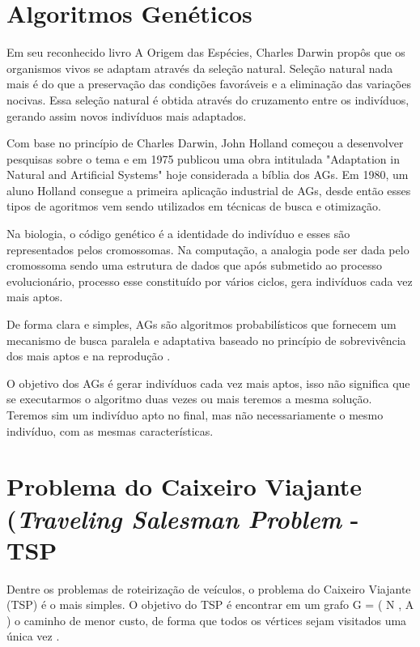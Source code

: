 \documentclass[final,5p,times,twocolumn]{elsarticle}
\begin{document}
	
	
\section {Algoritmos Genéticos}

	Em seu reconhecido livro A Origem das Espécies, Charles Darwin propôs que os organismos vivos se adaptam através 
	da seleção natural. Seleção natural nada mais é do que a preservação das condições favoráveis e a eliminação das 
	variações nocivas. Essa seleção natural é obtida através do cruzamento entre os indivíduos, gerando assim novos
 	indivíduos mais adaptados.

	Com base no princípio de Charles Darwin, John Holland começou a desenvolver pesquisas sobre o tema e em 1975 
	publicou uma obra intitulada "Adaptation in Natural and Artificial Systems" hoje considerada a bíblia dos AGs.
	Em 1980, um aluno Holland consegue a primeira aplicação industrial de AGs, desde então esses tipos de agoritmos vem 
	sendo utilizados em técnicas de busca e otimização.

	Na biologia, o código genético é a identidade do indivíduo e esses são representados pelos cromossomas. 
	Na computação, a analogia pode ser dada pelo cromossoma sendo uma estrutura de dados que após submetido 
	ao processo evolucionário, processo esse constituído por vários ciclos, gera indivíduos cada vez mais 
	aptos.

	De forma clara e simples, AGs são algoritmos probabilísticos que fornecem um mecanismo de busca paralela e adaptativa
	baseado no princípio de sobrevivência dos mais aptos e na reprodução \cite{0004-pdf}.

	O objetivo dos AGs é gerar indivíduos cada vez mais aptos, isso não significa que se executarmos o algoritmo 
	duas vezes ou mais teremos a mesma solução. Teremos sim um indivíduo apto no final, mas não necessariamente 
	o mesmo indivíduo, com as mesmas características.

\section {Problema do Caixeiro Viajante (\textit{Traveling Salesman Problem} - TSP}
	Dentre os problemas de roteirização de veículos, o problema do Caixeiro Viajante (TSP) é o mais simples.
	O objetivo do TSP é encontrar em um grafo G = ( N , A ) o caminho de menor custo, 
	de forma que todos os vértices sejam visitados uma única vez \cite{0006-pdf}.
	
\end{document}
